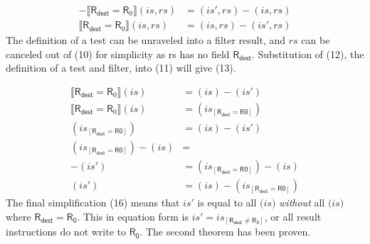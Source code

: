 \documentclass[12pt, letterpaper]{article}
\newcommand\interp[1]{\llbracket #1 \rrbracket}
\begin{document}
{\small
\begin{align}    
    - \interp{ \mathsf{R}_{\mathsf{dest}} = \mathsf{R}_0 } (\mathit{is}, \mathit{rs}) 
    &=
    (\mathit{is}', \mathit{rs}) - (\mathit{is}, \mathit{rs})
    \\
    \interp{ \mathsf{R}_{\mathsf{dest}} = \mathsf{R}_0 } (\mathit{is}, \mathit{rs}) 
    &=
    (\mathit{is}, \mathit{rs}) - (\mathit{is}', \mathit{rs})
\end{align}
}
    The definition of a test can be unraveled into a filter result, and $\mathit{rs}$ can be canceled out of (10) for simplicity as rs has no field $\mathsf{R_{dest}}$.  Substitution of (12), the definition of a test and filter, into (11) will give (13).
\par\nobreak
{\small
\begin{align}
    \interp{ \mathsf{R}_{\mathsf{dest}} = \mathsf{R}_0 } (\mathit{is})
    &=
    (\mathit{is}) - (\mathit{is}')
    \\
    \interp{ \mathsf{R}_{\mathsf{dest}} = \mathsf{R}_0 } (\mathit{is})
    &=
    (\mathit{is_{[\mathsf{R_{dest}=R0}]}})
    \\
    (\mathit{is_{[\mathsf{R_{dest}=R0}]}})
    &=
    (\mathit{is}) - (\mathit{is}')
    \\
    (\mathit{is_{[\mathsf{R_{dest}=R0}]}}) - (\mathit{is}) 
    &=
    \\
    - (\mathit{is}')
    &=
    (\mathit{is_{[\mathsf{R_{dest}=R0}]}}) - (\mathit{is})
    \\
    (\mathit{is}')
    &=
    (\mathit{is}) - (\mathit{is_{[\mathsf{R_{dest}=R0}]}})
\end{align}
}
    The final simplification (16) means that $\mathit{is}'$ is equal to all $\mathit(is)$ \textit{without} all $\mathit(is)$ where $\mathsf{R_{dest}} = \mathsf{R_{0}}$.
    This in equation form is $\mathit{is}' = \mathit{is_{[\mathsf{R_{dest} \neq \mathsf{R_{0}}}]}}$, or all result instructions do not write to $\mathsf{R_{0}}$.  The second theorem has been proven.
\end{document}
